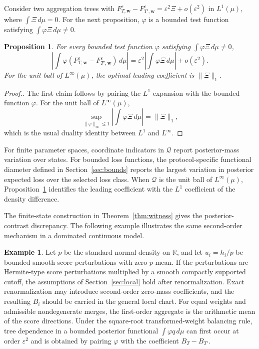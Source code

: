 \documentclass[11pt]{article}
\theoremstyle{plain}
\newtheorem{proposition}[theorem]{Proposition}
\theoremstyle{definition}
\newtheorem{example}{Example}
\theoremstyle{definition}
\newcommand{\eps}{\varepsilon}
\newcommand{\QoI}{\mathcal Q}
\newcommand{\wv}{\mathbf w}
\newcommand{\Fw}[1]{F_{#1,\wv}^{\eps}}
\begin{document}
Consider two aggregation trees with $\Fw{T}-\Fw{T'}=\eps^2\Xi+o(\eps^2)$
in $L^1(\mu)$, where $\int \Xi\,d\mu=0$. For the next proposition, $\varphi$ is a bounded test function satisfying $\int\varphi\Xi\,d\mu\ne0$.

\begin{proposition}\label{prop:qoi}
For every bounded test function $\varphi$ satisfying $\int\varphi\Xi\,d\mu\ne 0$,
\[
\left|\int\varphi(\Fw{T}-\Fw{T'})\,d\mu\right|
=\eps^2\left|\int\varphi\Xi\,d\mu\right|+o(\eps^2).
\]
For the unit ball of $L^\infty(\mu)$, the optimal leading coefficient is $\|\Xi\|_1$.
\end{proposition}

\begin{proof}[Proof.]
The first claim follows by pairing the $L^1$ expansion with the bounded function $\varphi$. For the unit ball of $L^\infty(\mu)$,
\[
\sup_{\|\varphi\|_\infty\le1}\left|\int\varphi\Xi\,d\mu\right|=\|\Xi\|_1,
\]
which is the usual duality identity between $L^1$ and $L^\infty$.
\end{proof}

For finite parameter spaces, coordinate indicators in $\QoI$ report posterior-mass variation over states. For bounded loss functions, the protocol-specific functional diameter defined in Section~\ref{sec:bounds} reports the largest variation in posterior expected loss over the selected loss class. When $\QoI$ is the unit ball of $L^\infty(\mu)$, Proposition~\ref{prop:qoi} identifies the leading coefficient with the $L^1$ coefficient of the density difference.



The finite-state construction in
Theorem~\ref{thm:witness} gives the posterior-contrast discrepancy. The following example illustrates the same second-order mechanism
in a dominated continuous model.
\begin{example}\label{ex:normal}
Let $p$ be the standard normal density on $\mathbb R$, and let $u_i=h_i/p$ be bounded smooth score perturbations with zero $p$-mean. If the perturbations are Hermite-type score perturbations multiplied by a smooth compactly supported cutoff, the assumptions of Section~\ref{sec:local} hold after renormalization. Exact renormalization may introduce second-order zero-mass coefficients, and the resulting $B_i$ should be carried in the general local chart. For equal weights and admissible nondegenerate merges, the first-order aggregate is the arithmetic mean of the score directions. Under the square-root transformed-weight balancing rule, tree dependence in a bounded posterior functional $\int \varphi q\,d\mu$ can first occur at order $\eps^2$ and is obtained by pairing $\varphi$ with the coefficient $B_T-B_{T'}$.
\end{example}
\end{document}
